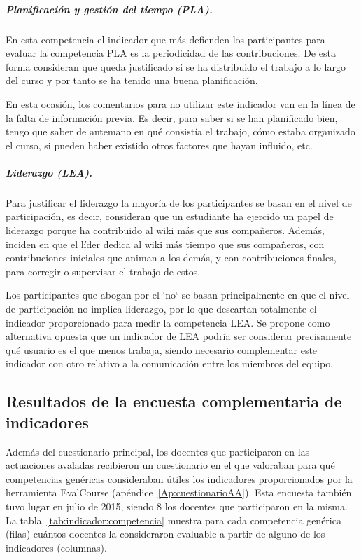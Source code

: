 \subparagraph*{Planificación y gestión del tiempo (PLA).}

En esta competencia el indicador que más defienden los participantes para evaluar la competencia PLA es la periodicidad de las contribuciones. De esta forma consideran que queda justificado si se ha distribuido el trabajo a lo largo del curso y por tanto se ha tenido una buena planificación.

En esta ocasión, los comentarios para no utilizar este indicador van en la línea de la falta de información previa. Es decir, para saber si se han planificado bien, tengo que saber de antemano en qué consistía el trabajo, cómo estaba organizado el curso, si pueden haber existido otros factores que hayan influido, etc. 

\subparagraph*{Liderazgo (LEA).}

Para justificar el liderazgo la mayoría de los participantes se basan en el nivel de participación, es decir, consideran que un estudiante ha ejercido un papel de liderazgo porque ha contribuido al wiki más que sus compañeros. Además, inciden en que el líder dedica al wiki más tiempo que sus compañeros, con contribuciones iniciales que animan a los demás, y con contribuciones finales, para corregir o supervisar el trabajo de estos.

Los participantes que abogan por el `no` se basan principalmente en que el nivel de participación no implica liderazgo, por lo que descartan totalmente el indicador proporcionado para medir la competencia LEA. Se propone como alternativa opuesta que un indicador de LEA podría ser considerar precisamente qué usuario es el que menos trabaja, siendo necesario complementar este indicador con otro relativo a la comunicación entre los miembros del equipo.

\subsection{Resultados de la encuesta complementaria de indicadores}

Además del cuestionario principal, los docentes que participaron en las actuaciones avaladas recibieron un cuestionario en el que valoraban para qué competencias genéricas consideraban útiles los indicadores proporcionados por la herramienta EvalCourse (apéndice~\ref{Ap:cuestionarioAA}). Esta encuesta también tuvo lugar en julio de 2015, siendo 8 los docentes que participaron en la misma. La tabla~\ref{tab:indicador:competencia} muestra para cada competencia genérica (filas) cuántos docentes la consideraron evaluable a partir de alguno de los indicadores (columnas).

